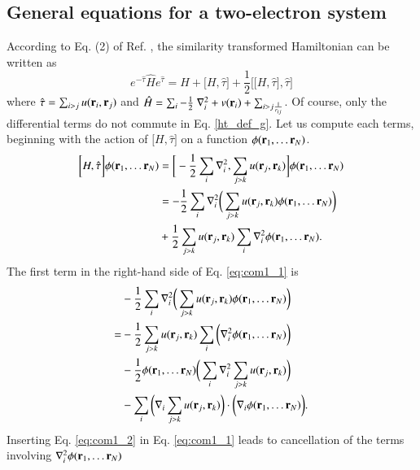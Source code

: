 \documentclass[aip,jcp,reprint,noshowkeys,superscriptaddress]{revtex4-1}
\newcommand{\br}[0]{{\bf {r}}}
\begin{document}
\subsection{General equations for a two-electron system}
According to Eq. (2) of Ref. , the similarity transformed Hamiltonian can be written as 
\begin{equation}
 \label{ht_def_g}
 e^{-\hat{\tau}} \hat{H} e^{\hat{\tau}} = H + \big[ H,\hat{\tau} \big] + \frac{1}{2}\bigg[ \big[H,\hat{\tau}\big],\hat{\tau}\bigg]
\end{equation}
where $\hat{\tau} = \sum_{i>j}u(\br{}_i,\br{}_j)$ and $\hat{H} = \sum_i -\frac{1}{2} \nabla^2_i + v(\br{}_i) + \sum_{i>j \frac{1}{r_{ij}}}$. Of course, only the differential terms do not commute in Eq. \eqref{ht_def_g}. 
Let us compute each terms, beginning with the action of $\big[ H,\hat{\tau} \big]$ on a function $\phi(\br{}_1,\hdots \br{}_N)$.
\begin{equation}
 \label{eq:com1_1}
 \begin{aligned}
 \bigg[ H,\hat{\tau} \bigg]\phi(\br{}_1,\hdots \br{}_N) & = \bigg[ -\frac{1}{2} \sum_i \nabla^2_i, \sum_{j>k} u(\br{}_j,\br{}_k) \bigg] \phi(\br{}_1,\hdots \br{}_N) \\
  & = -\frac{1}{2} \sum_i \nabla^2_i\bigg( \sum_{j>k} u(\br{}_j,\br{}_k) \phi(\br{}_1,\hdots \br{}_N) \bigg) \\
  & +  \frac{1}{2} \sum_{j>k} u(\br{}_j,\br{}_k) \sum_i \nabla^2_i \phi(\br{}_1,\hdots \br{}_N). 
 \end{aligned}
\end{equation}
The first term in the right-hand side of Eq. \eqref{eq:com1_1} is 
\begin{equation}
 \label{eq:com1_2}
 \begin{aligned}
&  -\frac{1}{2} \sum_i \nabla^2_i\bigg( \sum_{j>k} u(\br{}_j,\br{}_k) \phi(\br{}_1,\hdots \br{}_N) \bigg) \\ 
= &-\frac{1}{2}\sum_{j>k} u(\br{}_j,\br{}_k) \sum_i \bigg( \nabla^2_i \phi(\br{}_1,\hdots \br{}_N)\bigg) \\
  &-\frac{1}{2}\phi(\br{}_1,\hdots \br{}_N) \bigg( \sum_i \nabla^2_i \sum_{j>k} u(\br{}_j,\br{}_k) \bigg) \\
  &-\sum_i \bigg(\nabla_i \sum_{j>k}u(\br{}_j,\br{}_k) \bigg) \cdot \bigg( \nabla_i \phi(\br{}_1,\hdots \br{}_N) \bigg).
 \end{aligned}
\end{equation}
Inserting Eq. \eqref{eq:com1_2} in Eq. \eqref{eq:com1_1} leads to cancellation of the terms involving $\nabla^2_i \phi(\br{}_1,\hdots \br{}_N)$
\end{document}
